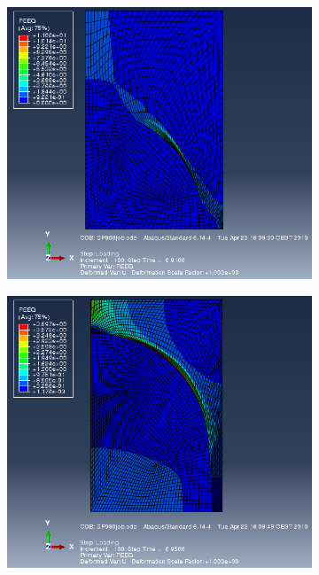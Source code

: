 \documentclass{article}
\begin{document}
\begin{figure}[h!]
\begin{subfigure}[b]{0.45\textwidth}
         \caption{}
         \label{fig:PlastStrain600}
     \end{subfigure}
          \hfill\\
     \begin{subfigure}[b]{0.45\textwidth}
         \centering
         \includegraphics[width=\textwidth]{PlastStrain800.png}
         \caption{}
         \label{fig:PlastStrain800}
     \end{subfigure}
     \begin{subfigure}[b]{0.45\textwidth}
         \centering
         \includegraphics[width=\textwidth]{PlastStrain980.png}
         \caption{}
         \label{fig:PlastStrain980}
     \end{subfigure}
     \caption{}
     \label{fig:PlasticStrain}
\end{figure}
\end{document}
